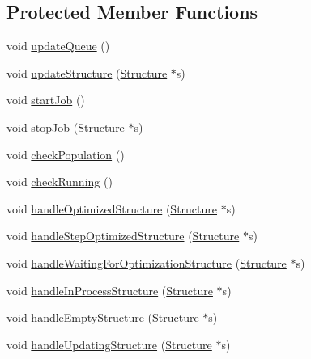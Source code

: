 \subsection*{Protected Member Functions}
\begin{DoxyCompactItemize}
\item 
void \hyperlink{classGlobalSearch_1_1QueueManager_a6fba282892d588e57520718d2f42401a}{update\+Queue} ()
\item 
void \hyperlink{classGlobalSearch_1_1QueueManager_a47014fddb8cfd2547899ca272dfb8b0a}{update\+Structure} (\hyperlink{classGlobalSearch_1_1Structure}{Structure} $\ast$s)
\item 
void \hyperlink{classGlobalSearch_1_1QueueManager_a643db68e2525754c897359dfff4dad66}{start\+Job} ()
\item 
void \hyperlink{classGlobalSearch_1_1QueueManager_ab4e0fef123622188942b2a4fe676dbd7}{stop\+Job} (\hyperlink{classGlobalSearch_1_1Structure}{Structure} $\ast$s)
\item 
void \hyperlink{classGlobalSearch_1_1QueueManager_a3c3de93fbb6a3f33d14ce74c541ba690}{check\+Population} ()
\item 
void \hyperlink{classGlobalSearch_1_1QueueManager_a2a85ad6729d9e0eb13782699b6cd5ccd}{check\+Running} ()
\item 
void \hyperlink{classGlobalSearch_1_1QueueManager_aabd2eebaed91b006309adff376cfc22a}{handle\+Optimized\+Structure} (\hyperlink{classGlobalSearch_1_1Structure}{Structure} $\ast$s)
\item 
void \hyperlink{classGlobalSearch_1_1QueueManager_ab9feeb85163af25cd067a5279cccff44}{handle\+Step\+Optimized\+Structure} (\hyperlink{classGlobalSearch_1_1Structure}{Structure} $\ast$s)
\item 
void \hyperlink{classGlobalSearch_1_1QueueManager_a6333f3ba572efd281e6dfd489c01ef8d}{handle\+Waiting\+For\+Optimization\+Structure} (\hyperlink{classGlobalSearch_1_1Structure}{Structure} $\ast$s)
\item 
void \hyperlink{classGlobalSearch_1_1QueueManager_a14667778b10fd542941121f75c01e522}{handle\+In\+Process\+Structure} (\hyperlink{classGlobalSearch_1_1Structure}{Structure} $\ast$s)
\item 
void \hyperlink{classGlobalSearch_1_1QueueManager_afe51c49057d5d0b8fa5ac1272e31fe9f}{handle\+Empty\+Structure} (\hyperlink{classGlobalSearch_1_1Structure}{Structure} $\ast$s)
\item 
void \hyperlink{classGlobalSearch_1_1QueueManager_a82b9d1f1df369bf14c1de84e0b4b5d70}{handle\+Updating\+Structure} (\hyperlink{classGlobalSearch_1_1Structure}{Structure} $\ast$s)

\end{DoxyCompactItemize}

